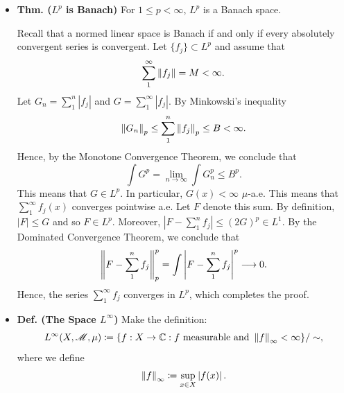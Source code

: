 \documentclass{article}
\begin{document}
\begin{itemize}
\begin{solutions}
\begin{equation}
		\end{equation}
	\end{solutions}  
	Note that Minkowski's inequality implies that $\norm{\empspace}_{p}$ is a norm for all $1 \leq p$. On the other hand, one can show that $\norm{\empspace}_{p}$ is concave for all $0 < p < 1$ so that it is definitely not a norm for these $L^{p}$ spaces. 
	\item \textbf{Thm. ($L^{p}$ is Banach)} For $1 \leq p < \infty$, $L^{p}$ is a Banach space. \newline 
	\begin{solutions}
		Recall that a normed linear space is Banach if and only if every absolutely convergent series is convergent. Let $\{f_{j}\} \subset L^{p}$ and assume that 
		\begin{equation}
			\sum_{1}^{\infty}\left\Vert f_{j} \right\Vert = M < \infty. 
		\end{equation}
		Let $G_{n} = \sum_{1}^{n}|f_{j}|$ and $G = \sum_{1}^{\infty}|f_{j}|$. By Minkowski's inequality 
		\begin{equation}
			\left\Vert G_{n} \right\Vert_{p}\leq \sum_{1}^{n}\left\Vert f_{j} \right\Vert_{p} \leq B < \infty. 
		\end{equation}
		Hence, by the Monotone Convergence Theorem, we conclude that 
		\begin{equation}
			\int G^{p} = \lim_{n \to\infty}\int G_{n}^{p} \leq B^{p}. 
		\end{equation}
		This means that $G \in L^{p}$. In particular, $G(x) < \infty$ $\mu$-a.e. This means that $\sum_{1}^{\infty}f_{j}(x)$ converges pointwise a.e. Let $F$ denote this sum. By definition, $|F| \leq G$ and so $F \in L^{p}$. Moreover, $|F - \sum_{1}^{n}f_{j}| \leq (2G)^{p} \in L^{1}$. By the Dominated Convergence Theorem, we conclude that 
		\begin{equation}
			\left\Vert F - \sum_{1}^{n}f_{j} \right\Vert_{p}^{p} = \int \left| F - \sum_{1}^{n}f_{j} \right|^{p} \longrightarrow 0. 
		\end{equation}
		Hence, the series $\sum_{1}^{\infty}f_{j}$ converges in $L^{p}$, which completes the proof. 
	\end{solutions}
	\item \textbf{Def. (The Space $L^{\infty}$)} Make the definition: 
	\begin{equation}
		L^{\infty}(X, \mathscr{M}, \mu) \coloneqq \brac*{f: X \to \mathbb{C}: f \text{ measurable and } \norm{f}_{\infty} < \infty}/\sim, 
	\end{equation}
	where we define 
	\begin{equation}
		\norm{f}_{\infty} \coloneqq \sup_{x \in X}\abs{f(x)}.

\end{equation}
\end{itemize}
\end{document}

